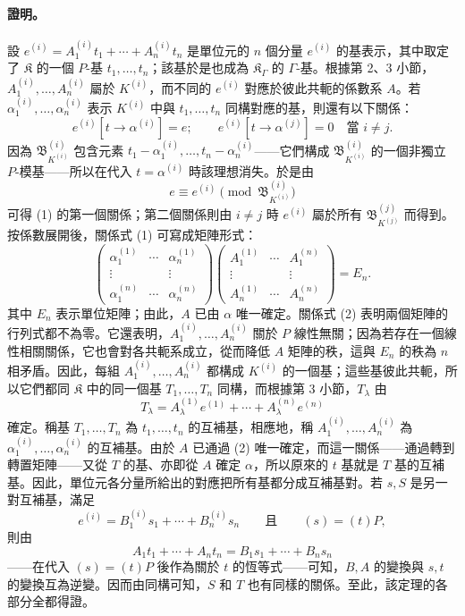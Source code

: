 \documentclass[11pt]{article}
\begin{document}
\paragraph{證明。}
設 $e^{(i)}=A_1^{(i)}t_1+\cdots+A_n^{(i)}t_n$ 是單位元的 $n$ 個分量 $e^{(i)}$ 的基表示，其中取定了 $\mathfrak K$ 的一個 $P$-基 $t_1,\ldots,t_n$；該基於是也成為 $\mathfrak K_\Gamma$ 的 $\Gamma$-基。根據第 2、3 小節，$A_1^{(i)},\ldots,A_n^{(i)}$ 屬於 $K^{(i)}$，而不同的 $e^{(i)}$ 對應於彼此共軛的係數系 $A$。若 $\alpha_1^{(i)},\ldots,\alpha_n^{(i)}$ 表示 $K^{(i)}$ 中與 $t_1,\ldots,t_n$ 同構對應的基，則還有以下關係：
\begin{equation}
e^{(i)}[t\to\alpha^{(i)}]=e;
\qquad e^{(i)}[t\to\alpha^{(j)}]=0\quad\text{當 }i\ne j. \tag{1}
\end{equation}
因為 $\mathfrak B_{K^{(i)}}^{(i)}$ 包含元素 $t_1-\alpha_1^{(i)},\ldots,t_n-\alpha_n^{(i)}$——它們構成 $\mathfrak B_{K^{(i)}}^{(i)}$ 的一個非獨立 $P$-模基——所以在代入 $t=\alpha^{(i)}$ 時該理想消失。於是由
\[
e\equiv e^{(i)}\pmod{\mathfrak B_{K^{(i)}}^{(i)}}
\]
可得 (1) 的第一個關係；第二個關係則由 $i\ne j$ 時 $e^{(i)}$ 屬於所有 $\mathfrak B_{K^{(j)}}^{(j)}$ 而得到。按係數展開後，關係式 (1) 可寫成矩陣形式：
\begin{equation}
\begin{pmatrix}
\alpha_1^{(1)}&\cdots&\alpha_n^{(1)}\\
\vdots&&\vdots\\
\alpha_1^{(n)}&\cdots&\alpha_n^{(n)}
\end{pmatrix}
\begin{pmatrix}
A_1^{(1)}&\cdots&A_1^{(n)}\\
\vdots&&\vdots\\
A_n^{(1)}&\cdots&A_n^{(n)}
\end{pmatrix}=E_n. \tag{2}
\end{equation}
其中 $E_n$ 表示單位矩陣；由此，$A$ 已由 $\alpha$ 唯一確定。關係式 (2) 表明兩個矩陣的行列式都不為零。它還表明，$A_1^{(i)},\ldots,A_n^{(i)}$ 關於 $P$ 線性無關；因為若存在一個線性相關關係，它也會對各共軛系成立，從而降低 $A$ 矩陣的秩，這與 $E_n$ 的秩為 $n$ 相矛盾。因此，每組 $A_1^{(i)},\ldots,A_n^{(i)}$ 都構成 $K^{(i)}$ 的一個基；這些基彼此共軛，所以它們都同 $\mathfrak K$ 中的同一個基 $T_1,\ldots,T_n$ 同構，而根據第 3 小節，$T_\lambda$ 由
\[
T_\lambda=A_\lambda^{(1)}e^{(1)}+\cdots+A_\lambda^{(n)}e^{(n)}
\]
確定。稱基 $T_1,\ldots,T_n$ 為 $t_1,\ldots,t_n$ 的互補基，相應地，稱 $A_1^{(i)},\ldots,A_n^{(i)}$ 為 $\alpha_1^{(i)},\ldots,\alpha_n^{(i)}$ 的互補基。由於 $A$ 已通過 (2) 唯一確定，而這一關係——通過轉到轉置矩陣——又從 $T$ 的基、亦即從 $A$ 確定 $\alpha$，所以原來的 $t$ 基就是 $T$ 基的互補基。因此，單位元各分量所給出的對應把所有基都分成互補基對。若 $s,S$ 是另一對互補基，滿足
\[
e^{(i)}=B_1^{(i)}s_1+\cdots+B_n^{(i)}s_n
\qquad\text{且}\qquad (s)=(t)P,
\]
則由
\[
A_1t_1+\cdots+A_nt_n=B_1s_1+\cdots+B_ns_n
\]
——在代入 $(s)=(t)P$ 後作為關於 $t$ 的恆等式——可知，$B,A$ 的變換與 $s,t$ 的變換互為逆變。因而由同構可知，$S$ 和 $T$ 也有同樣的關係。至此，該定理的各部分全都得證。
\end{document}
